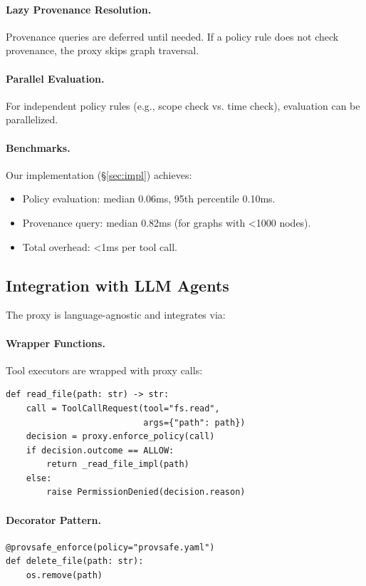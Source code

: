 \paragraph{Lazy Provenance Resolution.}
Provenance queries are deferred until needed. If a policy rule does not check provenance,
the proxy skips graph traversal.

\paragraph{Parallel Evaluation.}
For independent policy rules (e.g., scope check vs. time check), evaluation can be parallelized.

\paragraph{Benchmarks.}
Our implementation (\S\ref{sec:impl}) achieves:
\begin{itemize}[leftmargin=1.2em]
  \item Policy evaluation: median 0.06ms, 95th percentile 0.10ms.
  \item Provenance query: median 0.82ms (for graphs with <1000 nodes).
  \item Total overhead: <1ms per tool call.
\end{itemize}

\subsection{Integration with LLM Agents}

The proxy is language-agnostic and integrates via:

\paragraph{Wrapper Functions.}
Tool executors are wrapped with proxy calls:
\begin{verbatim}
def read_file(path: str) -> str:
    call = ToolCallRequest(tool="fs.read",
                           args={"path": path})
    decision = proxy.enforce_policy(call)
    if decision.outcome == ALLOW:
        return _read_file_impl(path)
    else:
        raise PermissionDenied(decision.reason)
\end{verbatim}

\paragraph{Decorator Pattern.}
\begin{verbatim}
@provsafe_enforce(policy="provsafe.yaml")
def delete_file(path: str):
    os.remove(path)
\end{verbatim}

